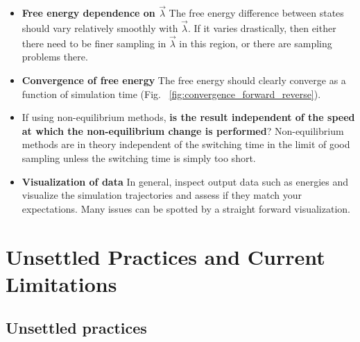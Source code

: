 \documentclass[9pt,bestpractices]{livecoms}
\begin{document}
\begin{itemize}
\item \textbf{Free energy dependence on $\vec{\lambda}$} The free energy difference between states should vary relatively smoothly with $\vec{\lambda}$. If it varies drastically, then either there need to be finer sampling in $\vec{\lambda}$ in this region, or there are sampling problems there.
\item \textbf{Convergence of free energy} The free energy should clearly converge as a function of simulation time (Fig. ~\ref{fig:convergence_forward_reverse}).
\item If using non-equilibrium methods, \textbf{is the result independent of the speed at which the non-equilibrium change is performed}? Non-equilibrium methods are in theory independent of the switching time in the limit of good sampling unless the switching time is simply too short. 
\item \textbf{Visualization of data} In general, inspect output data such as energies and visualize the simulation trajectories and assess if they match your expectations. Many issues can be spotted by a straight forward visualization. 
\end{itemize}


\section{Unsettled Practices and Current Limitations}
\label{sec:unsettled}

\subsection{Unsettled practices}
\end{document}
